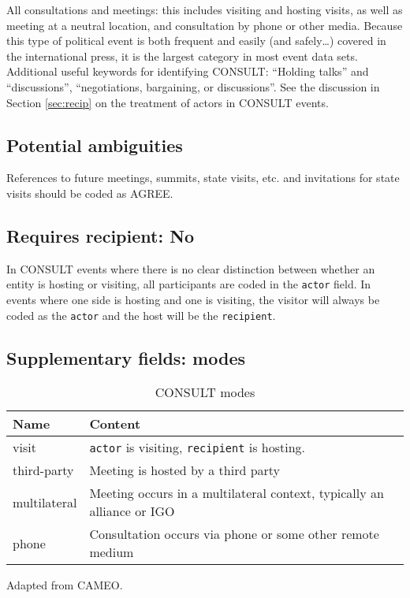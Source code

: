 \documentclass[11pt]{report}
\newcommand{\plcat}[1]{\textsf{#1}}
\newcommand{\txt}[1]{\texttt{#1}}
\begin{document}
All consultations and meetings: this includes visiting and hosting visits, as well as meeting at a neutral location, and consultation by phone or other media. Because this type of political event is both frequent and easily (and safely\ldots) covered in the international press, it is the largest category in most event data sets.  Additional useful keywords for identifying \plcat{CONSULT}: ``Holding talks'' and ``discussions'', ``negotiations, bargaining, or discussions''. See the discussion in Section \ref{sec:recip} on the treatment of actors in \plcat{CONSULT} events.

\subsection{Potential ambiguities}

References to future meetings, summits, state visits, etc. and invitations for state visits should be coded as \plcat{AGREE}.

\subsection{Requires recipient: No}

In \plcat{CONSULT} events where there is no clear distinction between whether an entity is hosting or visiting, all participants are coded in the \txt{actor} field. In events where one side is hosting and one is visiting, the visitor will always be coded as the \txt{actor} and the host will be the \txt{recipient}.

\subsection{Supplementary fields: modes}

\begin{table}[htp]
\caption{CONSULT modes}
\begin{center}
\begin{tabular}{|l|p{13cm}|}
\hline
Name & Content \\
\hline
visit & \txt{actor} is visiting, \txt{recipient} is hosting.\\
third-party & Meeting is hosted by a third party\\
multilateral & Meeting occurs in a multilateral context, typically an alliance or IGO\\
phone & Consultation occurs via phone or some other remote medium\\
\hline
\end{tabular}
\end{center}
\label{tab:consultmode}
Adapted from CAMEO.
\end{table}%
\end{document}
